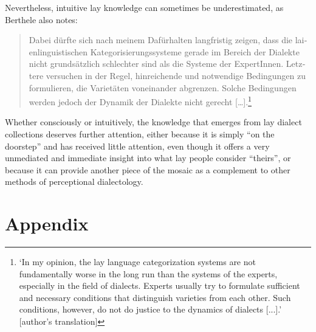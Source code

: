 \documentclass[output=paper]{langscibook}
\begin{document}
Nevertheless, intuitive lay knowledge can sometimes be underestimated, as Berthele also notes:

\begin{quote}
\begin{otherlanguage}{ngerman}
Dabei dürfte sich nach meinem Dafürhalten langfristig zeigen, dass die laienlinguistischen Kategorisierungssysteme gerade im Bereich der Dialekte nicht grundsätzlich schlechter sind als die Systeme der ExpertInnen. Letztere versuchen in der Regel, hinreichende und notwendige Bedingungen zu formulieren, die Varietäten voneinander abgrenzen. Solche Bedingungen werden jedoch der Dynamik der Dialekte nicht gerecht […].\footnote{‘In my opinion, the lay language categorization systems are not fundamentally worse in the long run than the systems of the experts, especially in the field of dialects. Experts usually try to formulate sufficient and necessary conditions that distinguish varieties from each other. Such conditions, however, do not do justice to the dynamics of dialects [...].’ [author’s translation]} \citep[263]{Berthele2010}
\end{otherlanguage}
\end{quote}

Whether consciously or intuitively, the knowledge that emerges from lay dialect collections deserves further attention, either because it is simply “on the doorstep” and has received little attention, even though it offers a very unmediated and immediate insight into what lay people consider “theirs”, or because it can provide another piece of the mosaic as a complement to other methods of perceptional dialectology.


\section*{Appendix}
\label{sec:kathrein:appendix}
\end{document}
